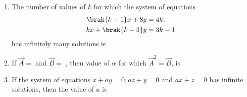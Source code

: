 \begin{enumerate}
\begin{multicols}{4}
        \begin{enumerate}
            \item -1,2 \columnbreak
            \item 1,2 \columnbreak
            \item 0,1 \columnbreak
            \item -1,1
        \end{enumerate}
    \end{multicols}
\item The number of values of $k$ for which the system of equations 
    \begin{align*}
    \brak{k+1}x + 8y&=4k; \\ kx +\brak{k+3}y&=3k-1 \end{align*} has infinitely many solutions is 
    \hfill{}
    \begin{enumerate}
    \end{enumerate}
%
\item If $\vec{A}=$
     and $\vec{B}=$ , then value of $\alpha$ for which $\vec{A}^2 = \vec{B}$, is
    \hfill{}
    \begin{enumerate}
    \end{enumerate}
%
\item If the system of equations $x + ay = 0, az + y =0$ and $ax + z =0$ has infinite solutions, then the value of $a$ is 
    \hfill{}
    \begin{enumerate}
            \begin{multicols}{2}


\end{multicols}
\end{enumerate}
\end{enumerate}
